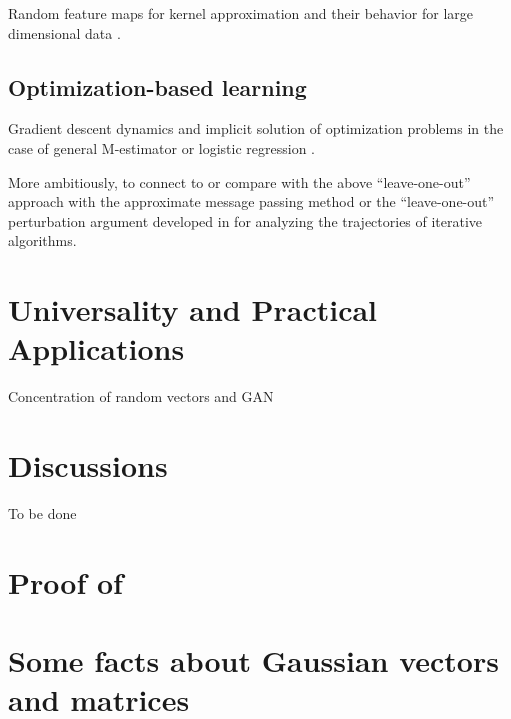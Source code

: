 \documentclass[MAL,biber]{nowfnt} %
\begin{document}
Random feature maps for kernel approximation \citep{rahimi2008random,rahimi2009weighted,vedaldi2012efficient} and their behavior for large dimensional data \citep{liao2018spectrum}.

\section{Optimization-based learning}

Gradient descent dynamics \citep{liao2018dynamics} and implicit solution of optimization problems in the case of general M-estimator \citep{el2013robust} or logistic regression \citep{candes2018phase}.

More ambitiously, to connect to or compare with the above ``leave-one-out'' approach with the approximate message passing method \citep{donoho2016high} or the ``leave-one-out'' perturbation argument developed in \citep{ma2017implicit} for analyzing the trajectories of iterative algorithms.

\chapter{Universality and Practical Applications}
\label{chap:universality-and-concentration}

Concentration of random vectors and GAN 

\chapter{Discussions}

\begin{acknowledgements}
To be done
\end{acknowledgements}

\appendix
\chapter{Proof of }\label{App:proof-of-}
\vspace*{-1.2in}

\chapter{Some facts about Gaussian vectors and matrices}
\end{document}
